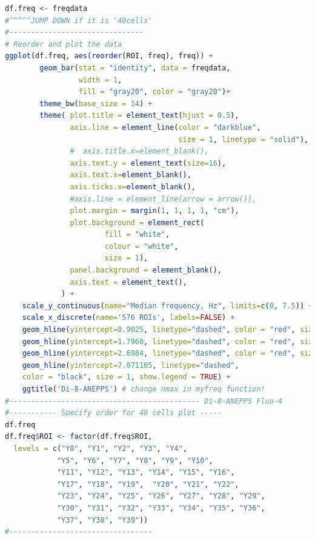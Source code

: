 \documentclass{biophys-new}
\begin{document}
\begin{lstlisting}[language=R]
df.freq <- freqdata
#^^^^^JUMP DOWN if it is '40cells'
#-------------------------------
# Reorder and plot the data
ggplot(df.freq, aes(reorder(ROI, freq), freq)) +
        geom_bar(stat = "identity", data = freqdata,
                 width = 1,
                 fill = "gray20", color = "gray20")+
        theme_bw(base_size = 14) +
        theme( plot.title = element_text(hjust = 0.5),
               axis.line = element_line(color = "darkblue",
                                        size = 1, linetype = "solid"),
               #  axis.title.x=element_blank(),
               axis.text.y = element_text(size=16),
               axis.text.x=element_blank(),
               axis.ticks.x=element_blank(),
               #axis.line = element_line(arrow = arrow()),
               plot.margin = margin(1, 1, 1, 1, "cm"),
               plot.background = element_rect(
                       fill = "white",
                       colour = "white",
                       size = 1),
               panel.background = element_blank(),
               axis.text = element_text(),
             ) +
    scale_y_continuous(name="Median frequency, Hz", limits=c(0, 7.5)) +
    scale_x_discrete(name='576 ROIs', labels=FALSE) +
    geom_hline(yintercept=0.9025, linetype="dashed", color = "red", size = 1) +
    geom_hline(yintercept=1.7960, linetype="dashed", color = "red", size = 1) +
    geom_hline(yintercept=2.6984, linetype="dashed", color = "red", size = 1) +
    geom_hline(yintercept=7.071105, linetype="dashed",
    color = "black", size = 1, show.legend = TRUE) +
    ggtitle('Di-8-ANEPPS') # change nmax in myfreq function!
#-------------------------------------------- Di-8-ANEPPS Fluo-4
#----------- Specify order for 40 cells plot -----
df.freq
df.freq$ROI <- factor(df.freq$ROI,
  levels = c("Y0", "Y1", "Y2", "Y3", "Y4",
            "Y5", "Y6", "Y7", "Y8", "Y9", "Y10",
            "Y11", "Y12", "Y13", "Y14", "Y15", "Y16",
            "Y17", "Y18", "Y19",  "Y20", "Y21", "Y22",
            "Y23", "Y24", "Y25", "Y26", "Y27", "Y28", "Y29",
            "Y30", "Y31", "Y32", "Y33", "Y34", "Y35", "Y36",
            "Y37", "Y38", "Y39"))
#---------------------------------


\end{lstlisting}
\end{document}
